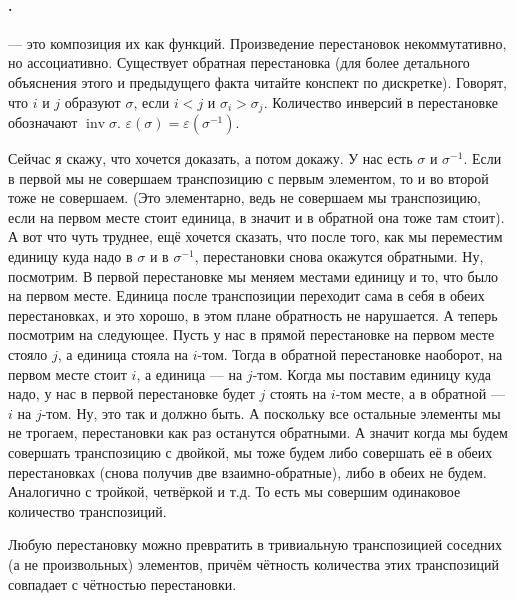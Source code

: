 \documentclass{article}
\begin{document}
    \paragraph{.}
    \begin{itemize}
        \dfn {} --- это композиция их как функций.
        \thm Произведение перестановок некоммутативно, но ассоциативно.
        \thm Существует обратная перестановка (для более детального объяснения этого и предыдущего факта читайте конспект по дискретке).
        \dfn Говорят, что $i$ и $j$ образуют  $\sigma$, если $i<j$ и $\sigma_i>\sigma_j$. Количество инверсий в перестановке обозначают $\operatorname{inv}\sigma$.
        \thm $\varepsilon(\sigma)=\varepsilon(\sigma^{-1})$.
        \begin{Proof}
            Сейчас я скажу, что хочется доказать, а потом докажу. У нас есть $\sigma$ и $\sigma^{-1}$. Если в первой мы не совершаем транспозицию с первым элементом, то и во второй тоже не совершаем. (Это элементарно, ведь не совершаем мы транспозицию, если на первом месте стоит единица, в значит и в обратной она тоже там стоит). А вот что чуть труднее, ещё хочется сказать, что после того, как мы переместим единицу куда надо в $\sigma$ и в $\sigma^{-1}$, перестановки снова окажутся обратными. Ну, посмотрим. В первой перестановке мы меняем местами единицу и то, что было на первом месте. Единица после транспозиции переходит сама в себя в обеих перестановках, и это хорошо, в этом плане обратность не нарушается. А теперь посмотрим на следующее. Пусть у нас в прямой перестановке на первом месте стояло $j$, а единица стояла на $i$-том. Тогда в обратной перестановке наоборот, на первом месте стоит $i$, а единица --- на $j$-том. Когда мы поставим единицу куда надо, у нас в первой перестановке будет $j$ стоять на $i$-том месте, а в обратной --- $i$ на $j$-том. Ну, это так и должно быть. А поскольку все остальные элементы мы не трогаем, перестановки как раз останутся обратными. А значит когда мы будем совершать транспозицию с двойкой, мы тоже будем либо совершать её в обеих перестановках (снова получив две взаимно-обратные), либо в обеих не будем. Аналогично с тройкой, четвёркой и т.д. То есть мы совершим одинаковое количество транспозиций.
        \end{Proof}
        \thm Любую перестановку можно превратить в тривиальную транспозицией соседних (а не произвольных) элементов, причём чётность количества этих транспозиций совпадает с чётностью перестановки.

\end{itemize}
\end{document}
